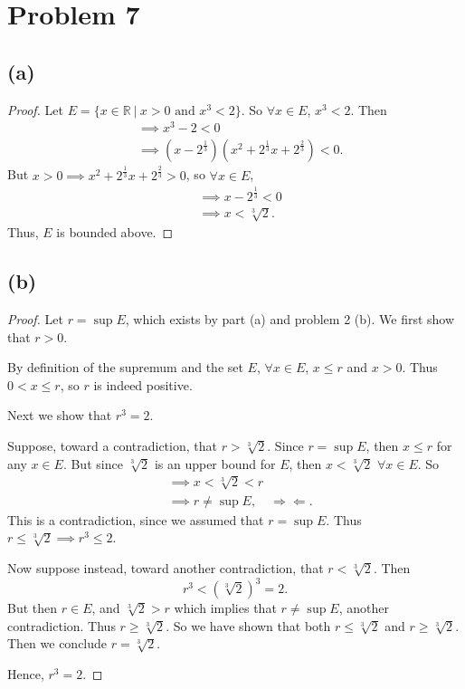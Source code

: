\documentclass{article}
\begin{document}
\section*{Problem 7}
\subsection*{(a)}
\begin{proof}
	Let $E = \{x\in\mathbb{R} \: | \: x>0 \textrm{ and } x^3 < 2\}$. So $\forall x \in E$, $x^3 < 2$. Then
	\begin{align}
		&\implies x^3 - 2 < 0 \\
		&\implies \left(x-2^{\frac{1}{3}}\right)\left(x^2 + 2^{\frac{1}{3}}x + 2^{\frac{2}{3}}\right) < 0.
	\end{align}
	But $x>0 \implies x^2 + 2^{\frac{1}{3}}x + 2^{\frac{2}{3}} > 0$, so $\forall x \in E$, 
	\begin{align}
		&\implies x-2^{\frac{1}{3}} < 0 \\
		&\implies x < \sqrt[3]{2}.
	\end{align}
	Thus, $E$ is bounded above.
\end{proof}

\subsection*{(b)}
\begin{proof}
	Let $r = \sup{E}$, which exists by part (a) and problem 2 (b). We first show that $r>0$. 
	
	By definition of the supremum and the set $E$, $\forall x \in E$, $x\leq r$ and $x>0$. Thus $0<x\leq r$, so $r$ is indeed positive.
	
	Next we show that $r^3 = 2$. 
	
	Suppose, toward a contradiction, that $r > \sqrt[3]{2}$. Since $r = \sup{E}$, then $x\leq r$ for any $x \in E$. But since $\sqrt[3]{2}$ is an upper bound for $E$, then $x < \sqrt[3]{2}$ $\forall x\in E$. So 
	\begin{align}
		&\implies x < \sqrt[3]{2} < r \\
		&\implies r \neq \sup{E}, \quad \Rightarrow\Leftarrow.
	\end{align}
	This is a contradiction, since we assumed that $r = \sup{E}$. Thus $r \leq \sqrt[3]{2} \implies r^3 \leq 2$.
	
	Now suppose instead, toward another contradiction, that $r<\sqrt[3]{2}$. Then
	\begin{equation}
		r^3 < \left(\sqrt[3]{2}\right)^3 = 2.
	\end{equation}
	But then $r\in E$, and $\sqrt[3]{2}>r$ which implies that $r \neq \sup{E}$, another contradiction. Thus $r \geq \sqrt[3]{2}$. So we have shown that both $r \leq \sqrt[3]{2}$ and $r \geq \sqrt[3]{2}$. Then we conclude $r=\sqrt[3]{2}$.
	
	Hence, $r^3 = 2$.
\end{proof}
\end{document}
